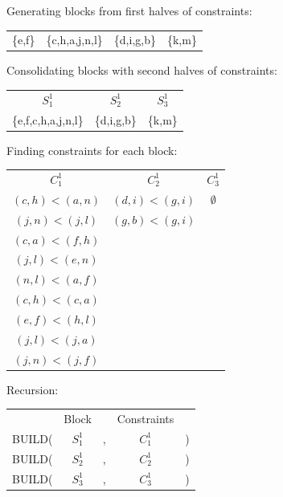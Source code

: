 \documentclass[11pt]{article} %
\begin{document}
\setcounter{subsubsection}{-1}

\subsubsection{}
	\begin{center}
	Generating blocks from first halves of constraints:
	
	\begin{tabular}{c c c c}
		\{e,f\} & \{c,h,a,j,n,l\} & \{d,i,g,b\} & \{k,m\}
	\end{tabular}
	
	Consolidating blocks with second halves of constraints:
	
	\begin{tabular}{c c c}
		\hspace{0.8cm}$S_1^1$\hspace{0.8cm} & \hspace{0.8cm}$S_2^1$\hspace{0.8cm} & \hspace{0.8cm}$S_3^1$\hspace{0.8cm} \\
		\{e,f,c,h,a,j,n,l\} & \{d,i,g,b\} & \{k,m\}
	\end{tabular}
	
	Finding constraints for each block:
	
	\begin{tabular}{c c c}
		\hspace{0.8cm}$C_1^1$\hspace{0.8cm} & \hspace{0.8cm}$C_2^1$\hspace{0.8cm} & \hspace{0.8cm}$C_3^1$\hspace{0.8cm} \\
		$(c,h)<(a,n)$ & $(d,i)<(g,i)$ & $\emptyset$ \\
		$(j,n)<(j,l)$ & $(g,b)<(g,i)$ \\
		$(c,a)<(f,h)$ \\
		$(j,l)<(e,n)$ \\
		$(n,l)<(a,f)$ \\
		$(c,h)<(c,a)$ \\
		$(e,f)<(h,l)$ \\
		$(j,l)<(j,a)$ \\
		$(j,n)<(j,f)$ \\
	\end{tabular}

	Recursion:
	
	\begin{tabular}{c c c c c}
		 & Block & & Constraints & \\
		BUILD( & $S_1^1$ & , & $C_1^1$ & ) \\
		BUILD( & $S_2^1$ & , & $C_2^1$ & ) \\
		BUILD( & $S_3^1$ & , & $C_3^1$ & )
	\end{tabular}
	\end{center}
\end{document}
